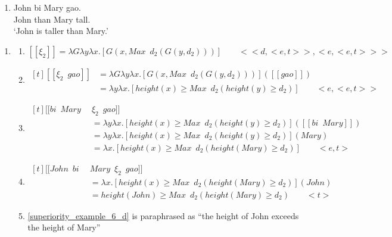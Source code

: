 \documentclass{ctexart}
\begin{document}
\begin{enumerate}
    \item \label{superiority_example_1_b_re}
    John bi Mary gao. \\
    John than Mary tall. \\
    `John is taller than Mary.'
\end{enumerate}

\begin{enumerate}
    \item \label{superiority_example_6}
    \begin{enumerate}
        \item \label{superiority_example_6_a}
        $[\![\xi_2]\!] = \lambda G \lambda y \lambda x.[G(x,Max \enspace d_2(G(y,d_2)))] \qquad <<d,<e,t>>,<e,<e,t>>>$

        \item \label{superiority_example_6_b}
        $\begin{aligned}[t]
            [\![\xi_2 \enspace gao]\!] 
            &= \lambda G \lambda y \lambda x.[G(x,Max \enspace d_2(G(y,d_2)))]([\![gao]\!]) \\
            &= \lambda y \lambda x.[height(x) \geq Max \enspace d_2(height(y) \geq d_2)] \qquad <e,<e,t>>
        \end{aligned}$

        \item \label{superiority_example_6_c}
        $\begin{aligned}[t]
            [\![bi \enspace Mary \enspace & \xi_2 \enspace gao]\!] \\
            &= \lambda y \lambda x.[height(x) \geq Max \enspace d_2(height(y) \geq d_2)]([\![bi \enspace Mary]\!]) \\
            &= \lambda y \lambda x.[height(x) \geq Max \enspace d_2(height(y) \geq d_2)](Mary) \\
            &= \lambda x.[height(x) \geq Max \enspace d_2(height(Mary) \geq d_2)] \qquad <e,t>
        \end{aligned}$

        \item \label{superiority_example_6_d}
        $\begin{aligned}[t]
            [\![John \enspace bi \enspace & Mary \enspace \xi_2 \enspace gao]\!] \\
            &= \lambda x.[height(x) \geq Max \enspace d_2(height(Mary) \geq d_2)](John) \\
            &= height(John) \geq Max \enspace d_2(height(Mary) \geq d_2 ) \qquad <t>
        \end{aligned}$

        \item \label{superiority_example_6_e}
        \ref{superiority_example_6_d} is paraphrased as ``the height of John exceeds the height of Mary''

    \end{enumerate}
\end{enumerate}
\end{document}
